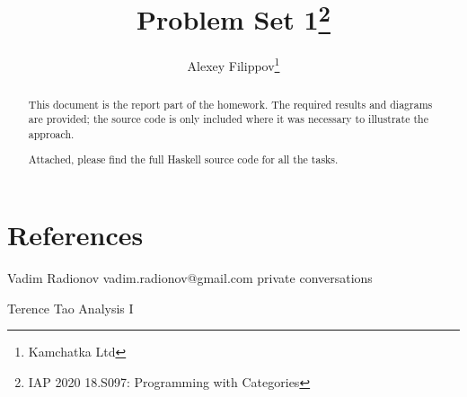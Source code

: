 \documentclass{tufte-handout}
\title{Problem Set 1\thanks{IAP 2020 18.S097: Programming with Categories}}
\author{Alexey Filippov\thanks{Kamchatka Ltd}}
\begin{document}
\maketitle%
\begin{abstract}
This document is the report part of the homework.
The required results and diagrams are provided; the source
code is only included where it was necessary to illustrate the approach.

Attached, please find the full Haskell source code for all the tasks.
\end{abstract}














\section{ References }

Vadim Radionov vadim.radionov@gmail.com private conversations

Terence Tao Analysis I





\end{document}
